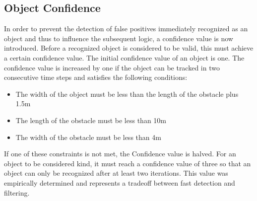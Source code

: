 \documentclass[11pt,oneside,openright]{mpreport}
\begin{document}
\subsection{Object Confidence}

In order to prevent the detection of false positives immediately recognized as an object and thus to influence the subsequent logic, a confidence value is now introduced. 
Before a recognized object is considered to be valid, this must achieve a certain confidence value. The initial confidence value of an object is one. 
The confidence value is increased by one if the object can be tracked in two consecutive time steps and satisfies the following conditions:

\begin{itemize}
\item The width of the object must be less than the length of the obstacle plus 1.5m
\item The length of the obstacle must be less than 10m
\item The width of the obstacle must be less than 4m
\end{itemize}
If one of these constraints is not met, the Confidence value is halved. For an object to be considered kind, it must reach a confidence value of three so that an object can only be 
recognized after at least two iterations. This value was empirically determined and represents a tradeoff between fast detection and filtering.
\end{document}
